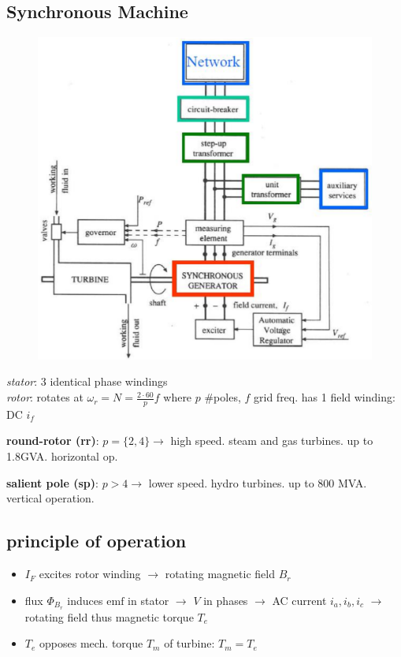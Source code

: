 \documentclass[a4paper,10pt,landscape]{scrartcl}
\begin{document}
\begin{multicols*}{3}
\vfill\null
\columnbreak


\section{Synchronous Machine}
\begin{figure}
    \centering
    \includegraphics[width=\linewidth]{src/sync_machine_in_network.png}
\end{figure}
\textit{stator}: 3 identical phase windings \\
\textit{rotor}: rotates at $\omega_r=N=\frac{2\cdot 60}{p}f$ where $p$ \#poles, $f$ grid freq. has 1 field winding: DC $i_f$

\textbf{round-rotor (rr)}:
$p=\{2,4\}\rightarrow$ high speed. steam and gas turbines. up to 1.8GVA. horizontal op. 

\textbf{salient pole (sp)}:
$p>4\rightarrow$ lower speed. hydro turbines. up to 800 MVA. vertical operation. 

\subsection{principle of operation}
\begin{itemize}
    \item $I_F$ excites rotor winding $\rightarrow$ rotating magnetic field $B_r$
    \item flux $\Phi_{B_{r}}$ induces $\mathrm{emf}$ in stator $\rightarrow$ $V$ in phases $\rightarrow$ AC current $i_a,i_b,i_c$ $\rightarrow$ rotating field thus magnetic torque $T_e$
    \item $T_e$ opposes mech. torque $T_m$ of turbine: $T_m=T_e$
\end{itemize}


\end{multicols*}
\end{document}
